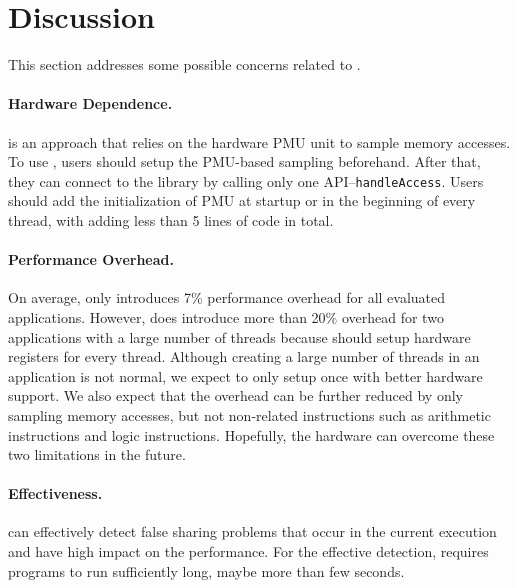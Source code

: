 \section{Discussion}

\label{sec:discuss}

This section addresses some possible concerns related to \Cheetah{}. 

\paragraph{Hardware Dependence.} \cheetah{} is an approach that relies on the hardware PMU unit to sample memory accesses. To use \cheetah{}, users should setup the PMU-based sampling beforehand. After that, they can connect to the \cheetah{} library by calling only one API--\texttt{handleAccess}. Users should add the initialization of PMU at startup or in the beginning of every thread, with adding less than 5 lines of code in total. 

\paragraph{Performance Overhead.} On average, \Cheetah{} only introduces 7\% performance overhead for all evaluated applications. However, \cheetah{} does introduce more than 20\% overhead for two applications with a large number of threads because \cheetah{} should setup hardware registers for every thread. Although creating a large number of threads in an application is not normal, we expect to only setup once with better hardware support. We also expect that the overhead can be further reduced by only sampling memory accesses, but not non-related instructions such as arithmetic instructions and logic instructions. Hopefully, the hardware can overcome these two limitations in the future.

\paragraph{Effectiveness.} \Cheetah{} can effectively detect false sharing problems that occur in the current execution and have high impact on the performance. For the effective detection, \Cheetah{} requires programs to run sufficiently long, maybe more than few seconds. 
